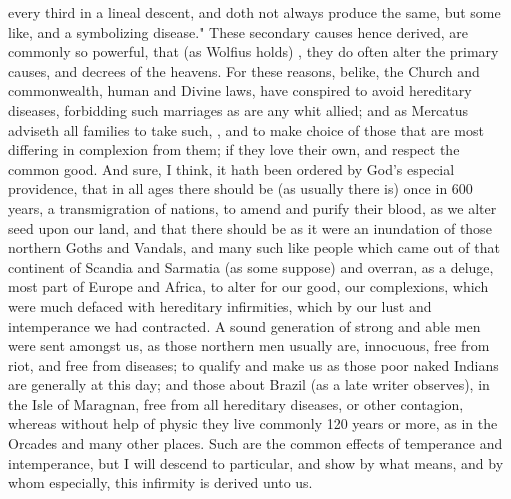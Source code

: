 every third in a lineal descent, and doth not always produce the same, but some
like, and a symbolizing disease." These secondary causes hence derived, are
commonly so powerful, that (as Wolfius holds) , they do often alter the primary causes, and decrees of
the heavens. For these reasons, belike, the Church and commonwealth, human and
Divine laws, have conspired to avoid hereditary diseases, forbidding such
marriages as are any whit allied; and as Mercatus adviseth all families to take
such, , and to make choice of
those that are most differing in complexion from them; if they love their own,
and respect the common good. And sure, I think, it hath been ordered by God's
especial providence, that in all ages there should be (as usually there is)
once in 600 years, a transmigration of nations, to amend
and purify their blood, as we alter seed upon our land, and that there should
be as it were an inundation of those northern Goths and Vandals, and many such
like people which came out of that continent of Scandia and Sarmatia (as some
suppose) and overran, as a deluge, most part of Europe and Africa, to alter for
our good, our complexions, which were much defaced with hereditary infirmities,
which by our lust and intemperance we had contracted. A sound generation of
strong and able men were sent amongst us, as those northern men usually are,
innocuous, free from riot, and free from diseases; to qualify and make us as
those poor naked Indians are generally at this day; and those about Brazil (as
a late writer observes), in the Isle of Maragnan, free
from all hereditary diseases, or other contagion, whereas without help of
physic they live commonly 120 years or more, as in the Orcades and many other
places. Such are the common effects of temperance and intemperance, but I will
descend to particular, and show by what means, and by whom especially, this
infirmity is derived unto us.

